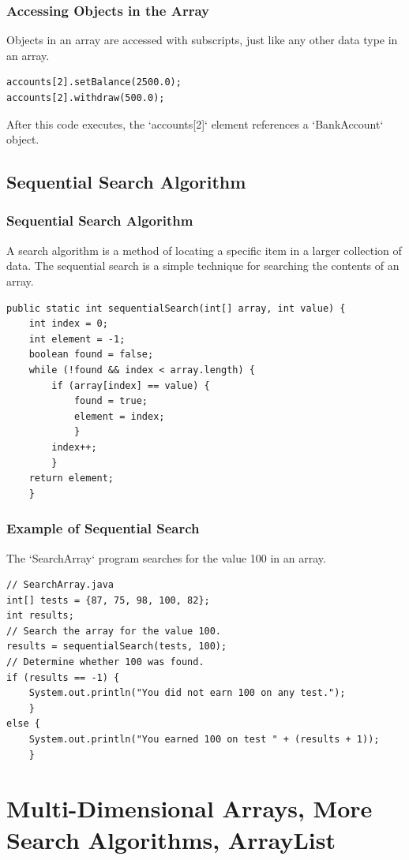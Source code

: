 \documentclass[11pt]{beamer}
\begin{document}
\begin{frame}[fragile]
    \frametitle{Accessing Objects in the Array}
    Objects in an array are accessed with subscripts, just like any other data type in an array.
    \begin{lstlisting}
accounts[2].setBalance(2500.0);
accounts[2].withdraw(500.0);
    \end{lstlisting}
    After this code executes, the `accounts[2]` element references a `BankAccount` object.
\end{frame}

\subsection{Sequential Search Algorithm}
\begin{frame}[fragile]
    \frametitle{Sequential Search Algorithm}

    A search algorithm is a method of locating a specific item in a larger collection of data. The sequential search is a simple technique for searching the contents of an array.

    \begin{lstlisting}[basicstyle=\ttfamily\footnotesize]
public static int sequentialSearch(int[] array, int value) {
    int index = 0;
    int element = -1;
    boolean found = false;
    while (!found && index < array.length) {
        if (array[index] == value) {
            found = true;
            element = index;
            }
        index++;
        }
    return element;
    }
    \end{lstlisting}
\end{frame}

\begin{frame}[fragile]
    \frametitle{Example of Sequential Search}
    The `SearchArray` program searches for the value 100 in an array.
    \begin{lstlisting}[basicstyle=\ttfamily\footnotesize]
// SearchArray.java
int[] tests = {87, 75, 98, 100, 82};
int results;
// Search the array for the value 100.
results = sequentialSearch(tests, 100);
// Determine whether 100 was found.
if (results == -1) {
    System.out.println("You did not earn 100 on any test.");
    } 
else {
    System.out.println("You earned 100 on test " + (results + 1));
    }
    \end{lstlisting}
\end{frame}

\section{Multi-Dimensional Arrays, More Search Algorithms, ArrayList}
\end{document}
